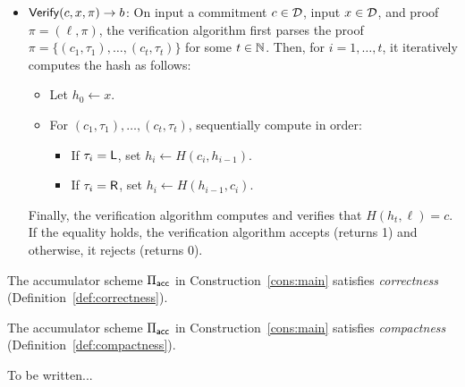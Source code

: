 \begin{construction}
\begin{itemize}
    \item $\mathsf{Verify}(c, x, \pi) \to b$: On input a commitment $c \in \mathcal{D}$, input
      $x \in \mathcal{D}$, and proof $\pi = (\ell, \pi)$, the verification algorithm
      first parses the proof $\pi = \{ (c_1, \tau_1), \ldots, (c_t, \tau_t) \}$
      for some $t \in \mathbb{N}$. Then, for $i = 1, \ldots, t$, it iteratively computes
      the hash as follows:
      \begin{itemize}
        \item Let $h_0 \gets x$.
        \item For $(c_1, \tau_1), \ldots, (c_t, \tau_t)$, sequentially compute
          in order:
          \begin{itemize}
            \item If $\tau_i = \mathsf{L}$, set $h_i
              \gets H(c_i, h_{i-1})$.
            \item If $\tau_i = \mathsf{R}$, set $h_i \gets H(h_{i-1}, c_i)$.
          \end{itemize}
      \end{itemize}
      Finally, the verification algorithm computes and verifies that $H(h_t,
      \ell) = c$. If the equality holds, the verification algorithm accepts
      (returns 1) and otherwise, it rejects (returns 0).

  \end{itemize}
\end{construction}

\begin{theorem}[Correctness]
    The accumulator scheme $\Pi_{\mathsf{acc}}$ in Construction~\ref{cons:main} satisfies
    \emph{correctness} (Definition~\ref{def:correctness}).
\end{theorem}

\begin{theorem}[Compactness]
    The accumulator scheme $\Pi_{\mathsf{acc}}$ in Construction~\ref{cons:main} satisfies
    \emph{compactness} (Definition~\ref{def:compactness}).
\end{theorem}

\begin{theorem}[Soundness]
    To be written...
\end{theorem}

